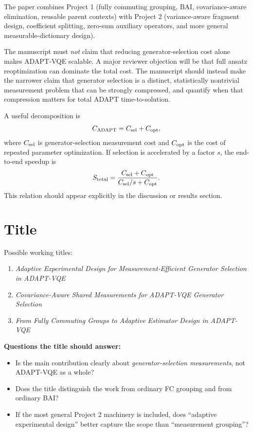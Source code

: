 \documentclass[aps,pra,reprint,superscriptaddress,nofootinbib]{revtex4-2}
\begin{document}
The paper combines Project 1 (fully commuting grouping, BAI, covariance-aware elimination, reusable parent contexts) with Project 2 (variance-aware fragment design, coefficient splitting, zero-sum auxiliary operators, and more general measurable-dictionary design).

The manuscript must \emph{not} claim that reducing generator-selection cost alone makes ADAPT-VQE scalable. A major reviewer objection will be that full ansatz reoptimization can dominate the total cost. The manuscript should instead make the narrower claim that generator selection is a distinct, statistically nontrivial measurement problem that can be strongly compressed, and quantify when that compression matters for total ADAPT time-to-solution.

A useful decomposition is
\begin{equation}
C_{\rm ADAPT}=C_{\rm sel}+C_{\rm opt},
\end{equation}
where $C_{\rm sel}$ is generator-selection measurement cost and $C_{\rm opt}$ is the cost of repeated parameter optimization. If selection is accelerated by a factor $s$, the end-to-end speedup is
\begin{equation}
S_{\rm total}=\frac{C_{\rm sel}+C_{\rm opt}}{C_{\rm sel}/s+C_{\rm opt}}.
\end{equation}
This relation should appear explicitly in the discussion or results section.

\section{Title}

Possible working titles:
\begin{enumerate}[leftmargin=2em]
\item \textit{Adaptive Experimental Design for Measurement-Efficient Generator Selection in ADAPT-VQE}
\item \textit{Covariance-Aware Shared Measurements for ADAPT-VQE Generator Selection}
\item \textit{From Fully Commuting Groups to Adaptive Estimator Design in ADAPT-VQE}
\end{enumerate}

\textbf{Questions the title should answer:}
\begin{itemize}[leftmargin=2em]
\item Is the main contribution clearly about \emph{generator-selection measurements}, not ADAPT-VQE as a whole?
\item Does the title distinguish the work from ordinary FC grouping and from ordinary BAI?
\item If the most general Project 2 machinery is included, does ``adaptive experimental design'' better capture the scope than ``measurement grouping''?
\end{itemize}
\end{document}
